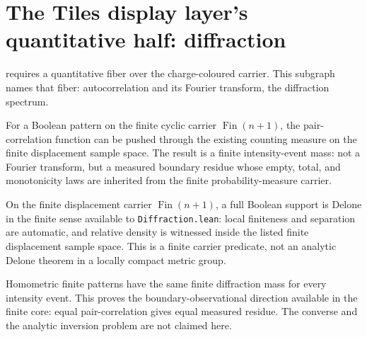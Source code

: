 \section{The Tiles display layer's quantitative half: diffraction}

 requires a quantitative fiber over the
charge-coloured carrier.  This subgraph names that fiber: autocorrelation and its
Fourier transform, the diffraction spectrum.

\begin{theorem}\label{thm:finite-diffraction-mass}\leanok{}
For a Boolean pattern on the finite cyclic carrier \(\operatorname{Fin}(n+1)\),
the pair-correlation function can be pushed through the existing counting
measure on the finite displacement sample space.  The result is a finite
intensity-event mass: not a Fourier transform, but a measured boundary residue
whose empty, total, and monotonicity laws are inherited from the finite
probability-measure carrier.
\end{theorem}

\begin{theorem}\label{thm:finite-displacement-delone}\leanok{}
On the finite displacement carrier \(\operatorname{Fin}(n+1)\), a full Boolean
support is Delone in the finite sense available to \texttt{Diffraction.lean}:
local finiteness and separation are automatic, and relative density is witnessed
inside the listed finite displacement sample space.  This is a finite carrier
predicate, not an analytic Delone theorem in a locally compact metric group.
\end{theorem}

\begin{theorem}\label{thm:homometric-finite-diffraction-mass}\leanok{}
Homometric finite patterns have the same finite diffraction mass for every
intensity event.  This proves the boundary-observational direction available in
the finite core: equal pair-correlation gives equal measured residue.  The
converse and the analytic inversion problem are not claimed here.
\end{theorem}

